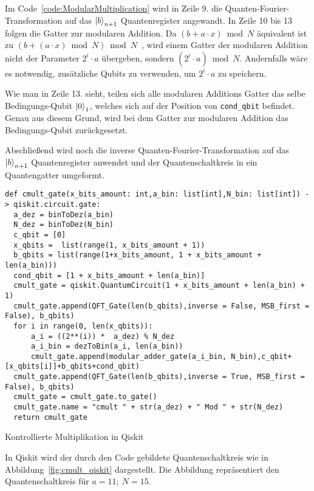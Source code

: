 Im Code~\ref{code:ModularMultiplication} wird in Zeile 9. die Quanten-Fourier-Transformation auf 
das \(\ket{b}_{n+1}\) Quantenregister angewandt.
In Zeile 10 bis 13 folgen die Gatter zur modularen Addition.
Da \((b + a \cdot x) \bmod N\) äquivalent ist zu \((b + (a \cdot x)\bmod N) \bmod N\)~\cite{koepf_modular_2021}, 
wird einem Gatter der modularen Addition nicht der Parameter \(2^i\cdot a\) übergeben, 
sondern \({(2^i\cdot a)\bmod N}\).
Andernfalls wäre es notwendig, 
zusätzliche Qubits zu verwenden, um \(2^i\cdot a\) zu speichern.

Wie man in Zeile 13. sieht, teilen sich alle modularen Additions Gatter das selbe Bedingungs-Qubit \(\ket{0}_1\), 
welches sich auf der Position von \texttt{cond_qbit} befindet.
Genau aus diesem Grund, wird bei dem Gatter zur modularen Addition das Bedingungs-Qubit zurückgesetzt.

Abschließend wird noch die inverse Quanten-Fourier-Transformation auf das \(\ket{b}_{n+1}\) Quantenregister anwendet und 
der Quantenschaltkreis in ein Quantengatter umgeformt.

\begin{listing}[H]

\begin{verbatim}
def cmult_gate(x_bits_amount: int,a_bin: list[int],N_bin: list[int]) -> qiskit.circuit.gate:  
  a_dez = binToDez(a_bin)
  N_dez = binToDez(N_bin)
  c_qbit = [0]
  x_qbits =  list(range(1, x_bits_amount + 1))
  b_qbits = list(range(1+x_bits_amount, 1 + x_bits_amount + len(a_bin)))
  cond_qbit = [1 + x_bits_amount + len(a_bin)]
  cmult_gate = qiskit.QuantumCircuit(1 + x_bits_amount + len(a_bin) + 1)
  cmult_gate.append(QFT_Gate(len(b_qbits),inverse = False, MSB_first = False), b_qbits)
  for i in range(0, len(x_qbits)):
      a_i = ((2**(i)) *  a_dez) % N_dez
      a_i_bin = dezToBin(a_i, len(a_bin))
      cmult_gate.append(modular_adder_gate(a_i_bin, N_bin),c_qbit+[x_qbits[i]]+b_qbits+cond_qbit)
  cmult_gate.append(QFT_Gate(len(b_qbits),inverse = True, MSB_first = False), b_qbits)
  cmult_gate = cmult_gate.to_gate()
  cmult_gate.name = "cmult " + str(a_dez) + " Mod " + str(N_dez)
  return cmult_gate
  \end{verbatim}
  \caption{Kontrollierte Multiplikation in Qiskit}
  \label{code:ModularMultiplication}
\end{listing}

In Qiskit wird der durch den Code gebildete Quantenschaltkreis wie in Abbildung~\ref{fig:cmult_qiskit} dargestellt.
Die Abbildung repräsentiert den Quantenschaltkreis für \(a = 11;~N = 15\).

